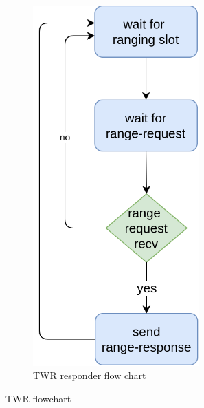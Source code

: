 \documentclass[\main/main.tex]{subfiles}
\begin{document}
\begin{figure}[H]
\begin{subfigure}[b]{0.47\textwidth}
\begin{center}
            \includegraphics[width=0.7\textwidth]{twr_responder.png}
        \end{center}
        \caption{TWR responder flow chart}
        \label{fig:twr_responder}
    \end{subfigure}
    \caption{TWR flowchart}
\end{figure}
\end{document}
